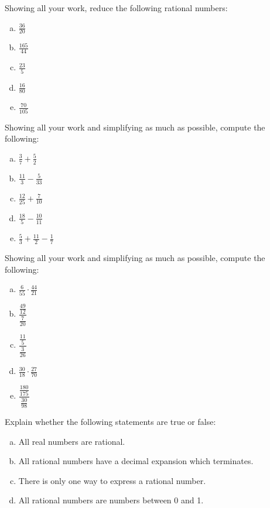 \documentclass[11pt,letterpaper]{article}
\begin{document}

 Showing all your work, reduce the following rational numbers:
	\begin{enumerate}[(a)]
	\item $\frac{36}{20}$
	\item $\frac{165}{44}$
	\item $\frac{23}{5}$
	\item $\frac{16}{80}$
	\item $\frac{70}{105}$
	\end{enumerate}



\newpage



 Showing all your work and simplifying as much as possible, compute the following:
	\begin{enumerate}[(a)]
	\item $\frac{3}{7} + \frac{5}{2}$
	\item $\frac{11}{3}  - \frac{5}{33}$
	\item $\frac{12}{25} + \frac{7}{10}$
	\item $\frac{18}{5} - \frac{10}{11}$
	\item $\frac{5}{3} + \frac{11}{2} - \frac{1}{7}$
	\end{enumerate}



\newpage



 Showing all your work and simplifying as much as possible, compute the following:
	\begin{enumerate}[(a)]
	\item $\frac{6}{55} \cdot \frac{44}{21}$
	\item $\dfrac{\frac{49}{12}}{\frac{7}{20}}$
	\item $\dfrac{\frac{11}{5}}{\frac{3}{26}}$
	\item $\frac{30}{18} \cdot \frac{27}{70}$
	\item $\dfrac{\frac{180}{175}}{\frac{30}{98}}$
	\end{enumerate}



\newpage



 Explain whether the following statements are true or false:
	\begin{enumerate}[(a)]
	\item All real numbers are rational. 
	\item All rational numbers have a decimal expansion which terminates. 
	\item There is only one way to express a rational number. 
	\item All rational numbers are numbers between 0 and 1. 
	\end{enumerate}
\end{document}
